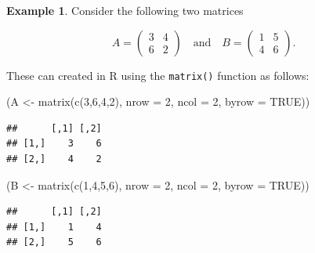 \documentclass[
]{book}
\newenvironment{Shaded}{\begin{snugshade}}{\end{snugshade}}
\newcommand{\AttributeTok}[1]{\textcolor[rgb]{0.77,0.63,0.00}{#1}}
\newcommand{\ConstantTok}[1]{\textcolor[rgb]{0.00,0.00,0.00}{#1}}
\newcommand{\DecValTok}[1]{\textcolor[rgb]{0.00,0.00,0.81}{#1}}
\newcommand{\FunctionTok}[1]{\textcolor[rgb]{0.00,0.00,0.00}{#1}}
\newcommand{\NormalTok}[1]{#1}
\newcommand{\OtherTok}[1]{\textcolor[rgb]{0.56,0.35,0.01}{#1}}
\theoremstyle{definition}
\theoremstyle{definition}
\newtheorem{example}{Example}[chapter]
\theoremstyle{definition}
\theoremstyle{definition}
\theoremstyle{remark}
\begin{document}
\begin{example}

Consider the following two matrices

\begin{equation*}
A = \left( \begin{array}{cc}
3 & 4 \\
6 & 2 \end{array} \right) \quad \text{and} \quad 
B = \left( \begin{array}{cc}
1 & 5 \\
4 & 6 \end{array} \right).
\end{equation*}

These can created in R using the \texttt{matrix()} function as follows:

\begin{Shaded}
\begin{Highlighting}[]
\NormalTok{(A }\OtherTok{\textless{}{-}} \FunctionTok{matrix}\NormalTok{(}\FunctionTok{c}\NormalTok{(}\DecValTok{3}\NormalTok{,}\DecValTok{6}\NormalTok{,}\DecValTok{4}\NormalTok{,}\DecValTok{2}\NormalTok{), }\AttributeTok{nrow =} \DecValTok{2}\NormalTok{, }\AttributeTok{ncol =} \DecValTok{2}\NormalTok{, }\AttributeTok{byrow =} \ConstantTok{TRUE}\NormalTok{))}
\end{Highlighting}
\end{Shaded}

\begin{verbatim}
##      [,1] [,2]
## [1,]    3    6
## [2,]    4    2
\end{verbatim}

\begin{Shaded}
\begin{Highlighting}[]
\NormalTok{(B }\OtherTok{\textless{}{-}} \FunctionTok{matrix}\NormalTok{(}\FunctionTok{c}\NormalTok{(}\DecValTok{1}\NormalTok{,}\DecValTok{4}\NormalTok{,}\DecValTok{5}\NormalTok{,}\DecValTok{6}\NormalTok{), }\AttributeTok{nrow =} \DecValTok{2}\NormalTok{, }\AttributeTok{ncol =} \DecValTok{2}\NormalTok{, }\AttributeTok{byrow =} \ConstantTok{TRUE}\NormalTok{))}
\end{Highlighting}
\end{Shaded}

\begin{verbatim}
##      [,1] [,2]
## [1,]    1    4
## [2,]    5    6
\end{verbatim}

\end{example}
\end{document}
